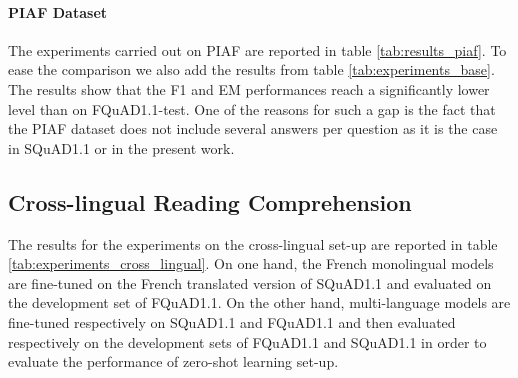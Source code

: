 \documentclass{article}
\begin{document}
\paragraph{PIAF Dataset}



The experiments carried out on PIAF are reported in table \ref{tab:results_piaf}. 
To ease the comparison we also add the results from table \ref{tab:experiments_base}.
The results show that the F1 and EM performances reach a significantly lower level than on FQuAD1.1-test. One of the reasons for such a gap is the fact that the PIAF dataset does not include several answers per question as it is the case in SQuAD1.1 or in the present work.

\begin{table}[ht]
    \small
    \centering
    \renewcommand{\arraystretch}{1.3}
    \caption{Results of the experiments for CamemBERT trained on \textbf{FQuAD1.0-train} and evaluated on PIAF.  \textit{(1)} has been trained with CamemBERT\textsubscript{BASE}, \textit{(2)} has been trained with CamemBERT\textsubscript{LARGE}.}
    \label{tab:results_piaf}
\end{table}

\subsection{Cross-lingual Reading Comprehension}

The results for the experiments on the cross-lingual set-up are reported in table \ref{tab:experiments_cross_lingual}. 
On one hand, the French monolingual models are fine-tuned on the French translated version of SQuAD1.1 and evaluated on the development set of FQuAD1.1.
On the other hand, multi-language models are fine-tuned respectively on SQuAD1.1 and FQuAD1.1 and then evaluated respectively on the development sets of FQuAD1.1 and SQuAD1.1 in order to evaluate the performance of zero-shot learning set-up.
\end{document}
